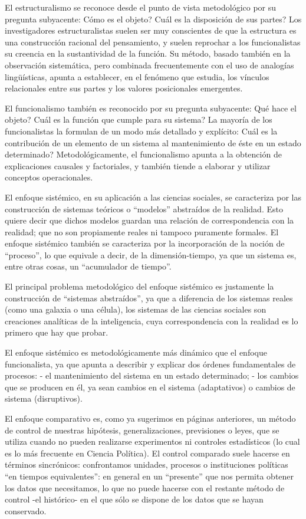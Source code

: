 \documentclass[
]{book}
\begin{document}
El estructuralismo se reconoce desde el punto de vista metodológico por su pregunta subyacente: Cómo es el objeto? Cuál es la disposición de sus partes? Los investigadores estructuralistas suelen ser muy conscientes de que la estructura es una construcción racional del pensamiento, y suelen reprochar a los funcionalistas su creencia en la sustantividad de la función. Su método, basado también en la observación sistemática, pero combinada frecuentemente con el uso de analogías lingüísticas, apunta a establecer, en el fenómeno que estudia, los vínculos relacionales entre sus partes y los valores posicionales emergentes.

El funcionalismo también es reconocido por su pregunta subyacente: Qué hace el objeto? Cuál es la función que cumple para su sistema? La mayoría de los funcionalistas la formulan de un modo más detallado y explícito: Cuál es la contribución de un elemento de un sistema al mantenimiento de éste en un estado determinado? Metodológicamente, el funcionalismo apunta a la obtención de explicaciones causales y factoriales, y también tiende a elaborar y utilizar conceptos operacionales.

El enfoque sistémico, en su aplicación a las ciencias sociales, se caracteriza por las construcción de sistemas teóricos o ``modelos'' abstraídos de la realidad. Esto quiere decir que dichos modelos guardan una relación de correspondencia con la realidad; que no son propiamente reales ni tampoco puramente formales. El enfoque sistémico también se caracteriza por la incorporación de la noción de ``proceso'', lo que equivale a decir, de la dimensión-tiempo, ya que un sistema es, entre otras cosas, un ``acumulador de tiempo''.

El principal problema metodológico del enfoque sistémico es justamente la construcción de ``sistemas abstraídos'', ya que a diferencia de los sistemas reales (como una galaxia o una célula), los sistemas de las ciencias sociales son creaciones analíticas de la inteligencia, cuya correspondencia con la realidad es lo primero que hay que probar.

El enfoque sistémico es metodológicamente más dinámico que el enfoque funcionalista, ya que apunta a describir y explicar dos órdenes fundamentales de procesos: - el mantenimiento del sistema en un estado determinado; - los cambios que se producen en él, ya sean cambios en el sistema (adaptativos) o cambios de sistema (disruptivos).

El enfoque comparativo es, como ya sugerimos en páginas anteriores, un método de control de nuestras hipótesis, generalizaciones, previsiones o leyes, que se utiliza cuando no pueden realizarse experimentos ni controles estadísticos (lo cual es lo más frecuente en Ciencia Política). El control comparado suele hacerse en términos sincrónicos: confrontamos unidades, procesos o instituciones políticas ``en tiempos equivalentes'': en general en un ``presente'' que nos permita obtener los datos que necesitamos, lo que no puede hacerse con el restante método de control -el histórico- en el que sólo se dispone de los datos que se hayan conservado.
\end{document}
